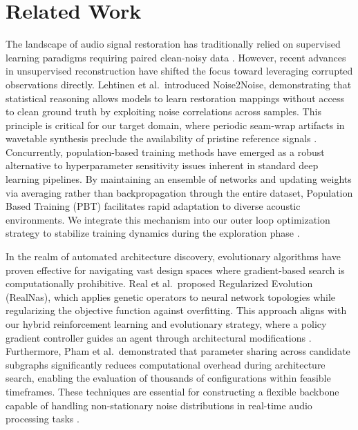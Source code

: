 \section{Related Work}

The landscape of audio signal restoration has traditionally relied on supervised learning paradigms requiring paired clean-noisy data \cite{snoek2012}. However, recent advances in unsupervised reconstruction have shifted the focus toward leveraging corrupted observations directly. Lehtinen et al.\ introduced Noise2Noise\cite{lehtinen2018}, demonstrating that statistical reasoning allows models to learn restoration mappings without access to clean ground truth by exploiting noise correlations across samples. This principle is critical for our target domain, where periodic seam-wrap artifacts in wavetable synthesis preclude the availability of pristine reference signals \cite{stoller2018}. Concurrently, population-based training methods have emerged as a robust alternative to hyperparameter sensitivity issues inherent in standard deep learning pipelines\cite{jaderberg2017}. By maintaining an ensemble of networks and updating weights via averaging rather than backpropagation through the entire dataset, Population Based Training (PBT) facilitates rapid adaptation to diverse acoustic environments. We integrate this mechanism into our outer loop optimization strategy to stabilize training dynamics during the exploration phase \cite{schulman2017}.

In the realm of automated architecture discovery, evolutionary algorithms have proven effective for navigating vast design spaces where gradient-based search is computationally prohibitive\cite{elsken2019}. Real et al.\ proposed Regularized Evolution (RealNas)\cite{real2019}, which applies genetic operators to neural network topologies while regularizing the objective function against overfitting. This approach aligns with our hybrid reinforcement learning and evolutionary strategy, where a policy gradient controller guides an agent through architectural modifications \cite{khadka2018}. Furthermore, Pham et al.\ demonstrated that parameter sharing across candidate subgraphs significantly reduces computational overhead during architecture search\cite{pham2018}, enabling the evaluation of thousands of configurations within feasible timeframes. These techniques are essential for constructing a flexible backbone capable of handling non-stationary noise distributions in real-time audio processing tasks \cite{elsken2019}.


